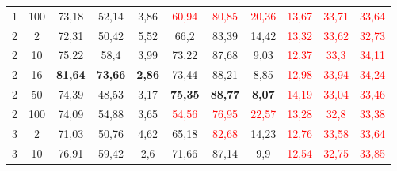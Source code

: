 \begin{table}[ht]
\begin{tabular}{cc|ccc|ccc|ccc}
        {1}                           & {100}  & {73,18}                             & {52,14}                             & {3,86}                                   & \textcolor{red}{60,94} & \textcolor{red}{80,85} & \textcolor{red}{20,36} & \textcolor{red}{13,67} & \textcolor{red}{33,71} & \textcolor{red}{33,64} \\
        {2}                           & {2}    & {72,31}                             & {50,42}                             & {5,52}                                   & {66,2}                 & {83,39}                & {14,42}                & \textcolor{red}{13,32} & \textcolor{red}{33,62} & \textcolor{red}{32,73} \\
        {2}                           & {10}   & {75,22}                             & {58,4}                              & {3,99}                                   & {73,22}                & {87,68}                & {9,03}                 & \textcolor{red}{12,37} & \textcolor{red}{33,3}  & \textcolor{red}{34,11} \\
        {2}                           & {16}   & {\textbf{81,64}}                    & {\textbf{73,66}}                    & {\textbf{2,86}}                          & {73,44}                & {88,21}                & {8,85}                 & \textcolor{red}{12,98} & \textcolor{red}{33,94} & \textcolor{red}{34,24} \\
        {2}                           & {50}   & {74,39}                             & {48,53}                             & {3,17}                                   & {\textbf{75,35}}       & \textbf{88,77}         & \textbf{8,07}          & \textcolor{red}{14,19} & \textcolor{red}{33,04} & \textcolor{red}{33,46} \\
        {2}                           & {100}  & {74,09}                             & {54,88}                             & {3,65}                                   & \textcolor{red}{54,56} & \textcolor{red}{76,95} & \textcolor{red}{22,57} & \textcolor{red}{13,28} & \textcolor{red}{32,8}  & \textcolor{red}{33,38} \\
        {3}                           & {2}    & {71,03}                             & {50,76}                             & {4,62}                                   & {65,18}                & \textcolor{red}{82,68} & {14,23}                & \textcolor{red}{12,76} & \textcolor{red}{33,58} & \textcolor{red}{33,64} \\
        {3}                           & {10}   & {76,91}                             & {59,42}                             & {2,6}                                    & {71,66}                & {87,14}                & {9,9}                  & \textcolor{red}{12,54} & \textcolor{red}{32,75} & \textcolor{red}{33,85} \\

\end{tabular}
\end{table}
